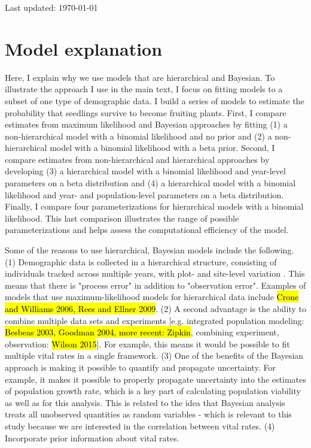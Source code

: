 \documentclass[12pt, oneside, titlepage]{article}   	%
\begin{document}
 

Last updated: \today

\section*{Model explanation}


Here, I explain why we use models that are hierarchical and Bayesian. To illustrate the approach I use in the main text, I focus on fitting models to a subset of one type of demographic data. I build a series of models to estimate the probability that seedlings survive to become fruiting plants. First, I compare estimates from maximum likelihood and Bayesian approaches by fitting (1) a non-hierarchical model with a binomial likelihood and no prior and (2) a non-hierarchical model with a binomial likelihood with a beta prior. Second, I compare estimates from non-hierarchical and hierarchical approaches by developing (3) a hierarchical model with a binomial likelihood and year-level parameters on a beta distribution and (4) a hierarchical model with a binomial likelihood and year- and population-level parameters on a beta distribution. Finally, I compare four parameterizations for hierarchical models with a binomial likelihood. This last comparison illustrates the range of possible parameterizations and helps assess the computational efficiency of the model. 

Some of the reasons to use hierarchical, Bayesian models include the following. (1) Demographic data is collected in a hierarchical structure, consisting of individuals tracked across multiple years, with plot- and site-level variation \cite{elderd2016}. This means that there is "process error" in addition to "observation error". Examples of models that use maximum-likelihood models for hierarchical data include \hl{Crone and Williams 2006, Rees and Ellner 2009}. (2) A second advantage is the ability to combine multiple data sets and experiments \cite{elderd2016} [e.g. integrated population modeling: \hl{Besbeas 2003, Goodman 2004, more recent: Zipkin}, combining experiment, observation: \hl{Wilson 2015}]. For example, this means it would be possible to fit multiple vital rates in a single framework. (3) One of the benefits of the Bayesian approach is making it possible to quantify and propagate uncertainty. For example, it makes it possible to properly propagate uncertainty into the estimates of population growth rate, which is a key part of calculating population viability as well as for this analysis. This is related to the idea that Bayesian analysis treats all unobserved quantities as random variables - which is relevant to this study because we are interested in the correlation between vital rates. (4) Incorporate prior information about vital rates. 
\end{document}

